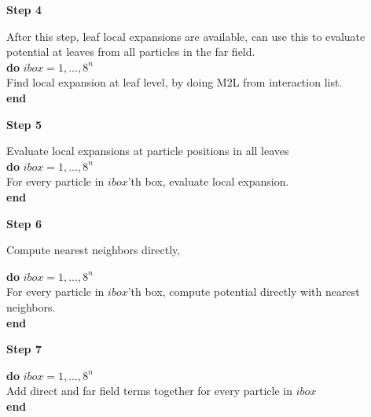 \begin{center}
    \textbf{Step 4}
\end{center}
After this step, leaf local expansions are available, can use this to evaluate
potential at leaves from all particles in the far field.\\

\noindent \textbf{do} $\textit{ibox}=1,...,8^n$ \\
\indent Find local expansion at leaf level, by doing M2L from interaction list. \\
\noindent \textbf{end}

\begin{center}
    \textbf{Step 5}
\end{center}
Evaluate local expansions at particle positions in all leaves\\

\noindent \textbf{do} $\textit{ibox}=1,...,8^n$ \\
\indent For every particle in $\textit{ibox}$'th box, evaluate local expansion. \\
\noindent \textbf{end} \\

\begin{center}
    \textbf{Step 6}
\end{center}
Compute nearest neighbors directly,

\noindent \textbf{do} $\textit{ibox}=1,...,8^n$ \\
\indent For every particle in $\textit{ibox}$'th box, compute potential directly with nearest neighbors. \\
\noindent \textbf{end} \\


\begin{center}
    \textbf{Step 7}
\end{center}

\noindent \textbf{do} $\textit{ibox}=1,...,8^n$ \\
\indent Add direct and far field terms together for every particle in $\textit{ibox}$\\
\noindent \textbf{end} \\
